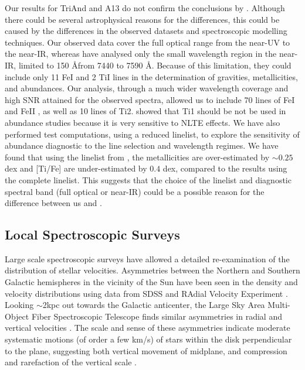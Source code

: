 \documentclass[galaxies,article,submit,moreauthors,pdftex,10pt,a4paper]{mdpi}
\newcommand{\ion}[1]{#1}
\begin{document}
Our results for TriAnd and A13 do not confirm the conclusions by \cite{chou2010b}. Although there could be several astrophysical reasons for the differences, this could be caused by the differences in the observed datasets and spectroscopic modelling techniques. Our observed data cover the full optical range from the near-UV to the near-IR, whereas \cite{chou2010b} have analysed only the small wavelength region in the near-IR, limited to 150 \AA from 7440 to 7590 \AA. Because of this limitation, they could include only 11 \ion{Fe}{I} and 2 \ion{Ti}{I} lines in the determination of gravities, metallicities, and abundances. Our analysis, through a much wider wavelength coverage and high SNR attained for the observed spectra, allowed us to include 70 lines of \ion{Fe}{I} and \ion{Fe}{II} \cite{bergemann2012}, as well as 10 lines of \ion{Ti}{2}. \cite{bergemann2011} showed that \ion{Ti}{1} should be not be used in abundance studies because it is very sensitive to NLTE effects. We have also performed test computations, using a reduced linelist, to explore the sensitivity of abundance diagnostic to the line selection and wavelength regimes. We have found that using the linelist from \cite{chou2010a}, the metallicities are over-estimated by $\sim 0.25$ dex and [Ti/Fe] are under-estimated by $0.4$ dex, compared to the results using the complete linelist. This suggests that the choice of the linelist and diagnostic spectral band (full optical or near-IR) could be a possible reason for the difference between us and \cite{chou2010}.

\subsection{Local Spectroscopic Surveys}


Large scale spectroscopic surveys have allowed a detailed re-examination of the distribution of stellar velocities.
Asymmetries between the Northern and Southern Galactic hemispheres in the vicinity of the Sun have been seen in the density and velocity distributions using data from SDSS \citep{widrow12,yanny13} and RAdial Velocity Experiment \citep[RAVE, see][]{??,williams13}.
Looking $\sim$2kpc out towards the Galactic anticenter, the Large Sky Area Multi-Object Fiber Spectroscopic Telescope \citep[LAMOST,][]{cui12,demg12,zhao12} finds similar asymmetries in radial and vertical velocities \citep{carlin13}.
The scale and sense of these asymmetries indicate moderate systematic motions (of order a few km/s)  of stars within the disk perpendicular to the plane,   suggesting both vertical movement of midplane, and compression and rarefaction of the vertical scale \citep[referred to as ``bending'' and ``breathing'' modes respectively --- see,][]{widrow14}.
\end{document}
